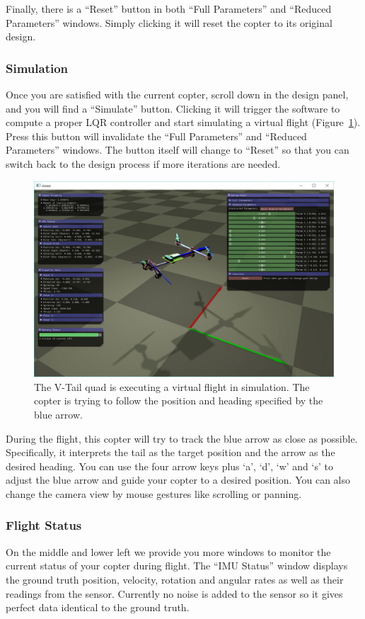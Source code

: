 Finally, there is a ``Reset'' button in both ``Full Parameters'' and ``Reduced Parameters'' windows. Simply clicking it will reset the copter to its original design.

\subsubsection{Simulation}
Once you are satisfied with the current copter, scroll down in the design panel, and you will find a ``Simulate'' button. Clicking it will trigger the software to compute a proper LQR controller and start simulating a virtual flight (Figure~\ref{fig:vtail_simulate}). Press this button will invalidate the ``Full Parameters'' and ``Reduced Parameters'' windows. The button itself will change to ``Reset'' so that you can switch back to the design process if more iterations are needed.
\begin{figure}[!htb]
  \centering
  \includegraphics[width=0.9\linewidth]{vtail_simulate}
  \caption{The V-Tail quad is executing a virtual flight in simulation. The copter is trying to follow the position and heading specified by the blue arrow.}
  \label{fig:vtail_simulate}
\end{figure}

During the flight, this copter will try to track the blue arrow as close as possible. Specifically, it interprets the tail as the target position and the arrow as the desired heading. You can use the four arrow keys plus `a', `d', `w' and `s' to adjust the blue arrow and guide your copter to a desired position. You can also change the camera view by mouse gestures like scrolling or panning.

\subsubsection{Flight Status}
On the middle and lower left we provide you more windows to monitor the current status of your copter during flight. The ``IMU Status'' window displays the ground truth position, velocity, rotation and angular rates as well as their readings from the sensor. Currently no noise is added to the sensor so it gives perfect data identical to the ground truth.

